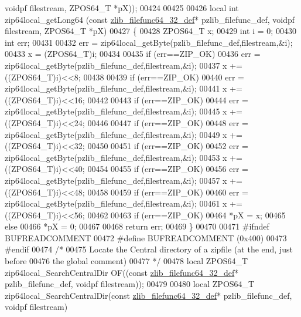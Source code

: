 \begin{DoxyCode}
      voidpf filestream, ZPOS64\_T *pX));
00424 
00425 
00426 local \textcolor{keywordtype}{int} zip64local\_getLong64 (\textcolor{keyword}{const} \hyperlink{structzlib__filefunc64__32__def__s}{zlib\_filefunc64\_32\_def}* pzlib\_filefunc\_def, 
      voidpf filestream, ZPOS64\_T *pX)
00427 \{
00428   ZPOS64\_T x;
00429   \textcolor{keywordtype}{int} i = 0;
00430   \textcolor{keywordtype}{int} err;
00431 
00432   err = zip64local\_getByte(pzlib\_filefunc\_def,filestream,&i);
00433   x = (ZPOS64\_T)i;
00434 
00435   \textcolor{keywordflow}{if} (err==ZIP\_OK)
00436     err = zip64local\_getByte(pzlib\_filefunc\_def,filestream,&i);
00437   x += ((ZPOS64\_T)i)<<8;
00438 
00439   \textcolor{keywordflow}{if} (err==ZIP\_OK)
00440     err = zip64local\_getByte(pzlib\_filefunc\_def,filestream,&i);
00441   x += ((ZPOS64\_T)i)<<16;
00442 
00443   \textcolor{keywordflow}{if} (err==ZIP\_OK)
00444     err = zip64local\_getByte(pzlib\_filefunc\_def,filestream,&i);
00445   x += ((ZPOS64\_T)i)<<24;
00446 
00447   \textcolor{keywordflow}{if} (err==ZIP\_OK)
00448     err = zip64local\_getByte(pzlib\_filefunc\_def,filestream,&i);
00449   x += ((ZPOS64\_T)i)<<32;
00450 
00451   \textcolor{keywordflow}{if} (err==ZIP\_OK)
00452     err = zip64local\_getByte(pzlib\_filefunc\_def,filestream,&i);
00453   x += ((ZPOS64\_T)i)<<40;
00454 
00455   \textcolor{keywordflow}{if} (err==ZIP\_OK)
00456     err = zip64local\_getByte(pzlib\_filefunc\_def,filestream,&i);
00457   x += ((ZPOS64\_T)i)<<48;
00458 
00459   \textcolor{keywordflow}{if} (err==ZIP\_OK)
00460     err = zip64local\_getByte(pzlib\_filefunc\_def,filestream,&i);
00461   x += ((ZPOS64\_T)i)<<56;
00462 
00463   \textcolor{keywordflow}{if} (err==ZIP\_OK)
00464     *pX = x;
00465   \textcolor{keywordflow}{else}
00466     *pX = 0;
00467 
00468   \textcolor{keywordflow}{return} err;
00469 \}
00470 
00471 \textcolor{preprocessor}{#ifndef BUFREADCOMMENT}
00472 \textcolor{preprocessor}{#define BUFREADCOMMENT (0x400)}
00473 \textcolor{preprocessor}{#endif}
00474 \textcolor{comment}{/*}
00475 \textcolor{comment}{  Locate the Central directory of a zipfile (at the end, just before}
00476 \textcolor{comment}{    the global comment)}
00477 \textcolor{comment}{*/}
00478 local ZPOS64\_T zip64local\_SearchCentralDir OF((\textcolor{keyword}{const} \hyperlink{structzlib__filefunc64__32__def__s}{zlib\_filefunc64\_32\_def}* 
      pzlib\_filefunc\_def, voidpf filestream));
00479 
00480 local ZPOS64\_T zip64local\_SearchCentralDir(\textcolor{keyword}{const} \hyperlink{structzlib__filefunc64__32__def__s}{zlib\_filefunc64\_32\_def}* 
      pzlib\_filefunc\_def, voidpf filestream)

\end{DoxyCode}
